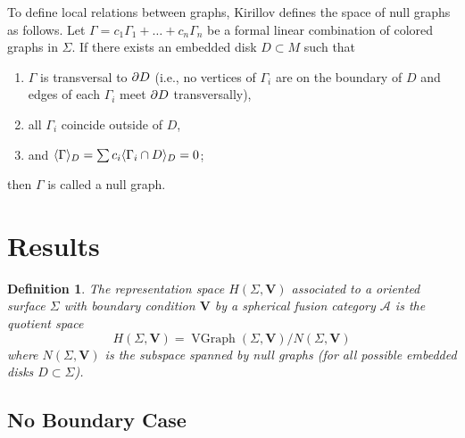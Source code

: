\documentclass{amsart}
\newtheorem{prop}[thm]{Proposition}
\newtheorem{defn}[thm]{Definition}
\newcommand{\Hs}{H}
\DeclareMathOperator{\MCG}{MCG}
\DeclareMathOperator{\Homeo}{Homeo}
\DeclareMathOperator{\VGr}{VGraph}
\newcommand{\VV}{\mathbf{V}}       %
\newcommand{\Ga}{\Gamma}
\newcommand{\Si}{\Sigma}
\begin{document}
To define local relations between graphs, Kirillov defines the space of
null graphs as follows. Let
$\Ga=c_1\Ga_1+\dots+c_n\Ga_n$ be a formal linear
combination of colored graphs in $\Si$.  If there exists an embedded disk $D \subset M$ such that
\begin{enumerate}
  \item $\Ga$ is transversal to $\partial D$ (i.e., no vertices of $\Ga_i$ 
      are on the boundary of $D$ and edges of each $\Ga_i$ meet 
      $\partial D$ transversally),
  \item all $\Ga_i$ coincide outside of $D$,
  \item and $\<\Ga\>_D=\sum c_i\<\Ga_i\cap D\>_D=0$;
\end{enumerate}
then $\Ga$ is called a null graph. 

\section{Results}

\begin{defn}
The representation space $\Hs(\Si, \VV)$ associated to a oriented surface $\Si$ with boundary condition $\VV$ by a spherical fusion category $\mathcal A$ is the quotient space
 $$
   \Hs(\Si, \VV)=\VGr(\Si, \VV)/N(\Si, \VV)
  $$
  where $N(\Si, \VV)$ is  the subspace spanned by null graphs 
  (for all possible embedded disks  $D\subset \Si$). 
\end{defn}

\subsection{No Boundary Case}


\end{document}

